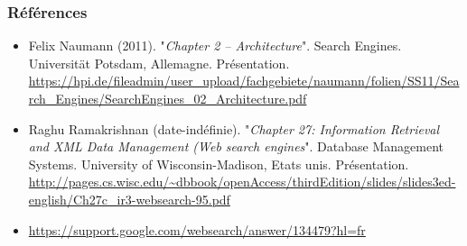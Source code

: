 \documentclass{beamer}
\begin{document}
\begin{frame}
\frametitle{Références}

\tiny

\begin{itemize}
	\item Felix Naumann (2011). 
	"\textit{Chapter 2 – Architecture}". 
	Search Engines. 
	Universität Potsdam, Allemagne. Présentation.
	\url{https://hpi.de/fileadmin/user_upload/fachgebiete/naumann/folien/SS11/Search_Engines/SearchEngines_02_Architecture.pdf}
	
	\item Raghu Ramakrishnan (date-indéfinie).
	"\textit{Chapter 27: Information Retrieval and XML Data Management (Web search engines}". 
	Database Management Systems. 
	University of Wisconsin-Madison, Etats unis. Présentation.
	\url{http://pages.cs.wisc.edu/~dbbook/openAccess/thirdEdition/slides/slides3ed-english/Ch27c_ir3-websearch-95.pdf}
	
	\item \url{https://support.google.com/websearch/answer/134479?hl=fr}
	
\end{itemize}

\end{frame}

%
% 
\end{document}
